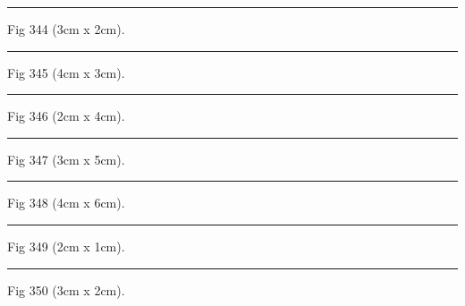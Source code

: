 \documentclass[a4paper,11pt]{article}
\begin{document}
\begin{swarmwrap}%
  \begin{minipage}[t]{3cm}
    \centering
    \rule{\linewidth}{2cm}
    {\footnotesize Fig 344 (3cm x 2cm).}
  \end{minipage}%
\end{swarmwrap}%
\swarmwrapnext
\lipsum[44]%

\begin{swarmwrap}%
  \begin{minipage}[t]{4cm}
    \centering
    \rule{\linewidth}{3cm}
    {\footnotesize Fig 345 (4cm x 3cm).}
  \end{minipage}%
\end{swarmwrap}%
\swarmwrapnext
\lipsum[45]%

\begin{swarmwrap}%
  \begin{minipage}[t]{2cm}
    \centering
    \rule{\linewidth}{4cm}
    {\footnotesize Fig 346 (2cm x 4cm).}
  \end{minipage}%
\end{swarmwrap}%
\swarmwrapnext
\lipsum[46]%

\begin{swarmwrap}%
  \begin{minipage}[t]{3cm}
    \centering
    \rule{\linewidth}{5cm}
    {\footnotesize Fig 347 (3cm x 5cm).}
  \end{minipage}%
\end{swarmwrap}%
\swarmwrapnext
\lipsum[47]%

\begin{swarmwrap}%
  \begin{minipage}[t]{4cm}
    \centering
    \rule{\linewidth}{6cm}
    {\footnotesize Fig 348 (4cm x 6cm).}
  \end{minipage}%
\end{swarmwrap}%
\swarmwrapnext
\lipsum[48]%

\begin{swarmwrap}%
  \begin{minipage}[t]{2cm}
    \centering
    \rule{\linewidth}{1cm}
    {\footnotesize Fig 349 (2cm x 1cm).}
  \end{minipage}%
\end{swarmwrap}%
\swarmwrapnext
\lipsum[49]%

\begin{swarmwrap}%
  \begin{minipage}[t]{3cm}
    \centering
    \rule{\linewidth}{2cm}
    {\footnotesize Fig 350 (3cm x 2cm).}
  \end{minipage}%
\end{swarmwrap}%
\swarmwrapnext
\lipsum[50]%
\end{document}
